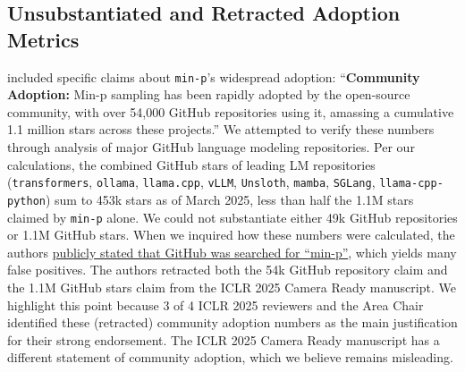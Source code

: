 \subsection{Unsubstantiated and Retracted Adoption Metrics}
\label{sec:community_adoption}

\citet{nguyen2024minp} included specific claims about \texttt{min-p}'s widespread adoption: ``\textbf{Community Adoption:} Min-p sampling has been rapidly adopted by the open-source community, with over 54,000 GitHub repositories using it, amassing a cumulative 1.1 million stars across these projects.''
%
We attempted to verify these numbers through analysis of major GitHub language modeling repositories.
Per our calculations, the combined GitHub stars of leading LM repositories (\texttt{transformers}, \texttt{ollama}, \texttt{llama.cpp}, \texttt{vLLM}, \texttt{Unsloth}, \texttt{mamba}, \texttt{SGLang}, \texttt{llama-cpp-python}) sum to 453k stars as of March 2025, less than half the 1.1M stars claimed by \texttt{min-p} alone.
We could not substantiate either 49k GitHub repositories or 1.1M GitHub stars. 
When we inquired how these numbers were calculated, the authors \href{https://github.com/menhguin/minp_paper/issues/6#issuecomment-2686274162}{publicly stated that GitHub was searched for ``min-p''}, which yields many false positives. The authors retracted both the 54k GitHub repository claim and the 1.1M GitHub stars claim from the ICLR 2025 Camera Ready manuscript.
We highlight this point because 3 of 4 ICLR 2025 reviewers and the Area Chair identified these (retracted) community adoption numbers as the main justification for their strong endorsement.
The ICLR 2025 Camera Ready manuscript has a different statement of community adoption, which we believe remains misleading.
